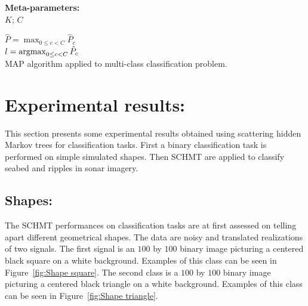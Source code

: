 \documentclass[a4paper,11pt]{report}
\begin{document}
		\begin{center}
			\begin{algorithm}
				\textbf{Meta-parameters:}\\
					$K$; $C$ 
					
				
				$\hat{P}= \max_{0\leq c < C} \hat{P}_{c}$\\
				$l= \mathop{\rm argmax}_{0\leq c < C} \hat{P}_{c}$\\
				
				\caption{MAP algorithm applied to multi-class classification problem.}
				\label{algo:MAP clf}
			\end{algorithm}        
		\end{center}
    
\chapter{Experimental results:}
  \label{chap:Exp}
  This section presents some experimental results obtained using scattering hidden Markov trees for classification tasks. First a binary classification task is performed on simple simulated shapes. Then SCHMT are applied to classify seabed and ripples in sonar imagery.
  
  \section{Shapes:}
		\label{sec:Exp/Shape:}
		
		The SCHMT performances on classification tasks are at first assessed on telling apart different geometrical shapes. The data are noisy and translated realizations of two signals. The first signal is an $100$ by $100$ binary image picturing a centered black square on a white background. Examples of this class can be seen in Figure~\ref{fig:Shape square}. The second class is a $100$ by $100$ binary image picturing a centered black triangle on a white background. Examples of this class can be seen in Figure~\ref{fig:Shape triangle}. 
		
\end{document}
